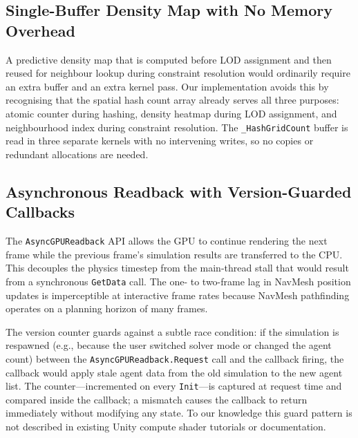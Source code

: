 \subsection{Single-Buffer Density Map with No Memory Overhead}

A predictive density map that is computed before LOD assignment and then reused
for neighbour lookup during constraint resolution would ordinarily require an
extra buffer and an extra kernel pass.  Our implementation avoids this by
recognising that the spatial hash count array already serves all three
purposes: atomic counter during hashing, density heatmap during LOD assignment,
and neighbourhood index during constraint resolution.  The
\texttt{\_HashGridCount} buffer is read in three separate kernels with no
intervening writes, so no copies or redundant allocations are needed.

\subsection{Asynchronous Readback with Version-Guarded Callbacks}

The \texttt{AsyncGPUReadback} API allows the GPU to continue rendering the
next frame while the previous frame's simulation results are transferred to the
CPU.  This decouples the physics timestep from the main-thread stall that would
result from a synchronous \texttt{GetData} call.  The one- to two-frame lag
in NavMesh position updates is imperceptible at interactive frame rates because
NavMesh pathfinding operates on a planning horizon of many frames.

The version counter guards against a subtle race condition: if the simulation
is respawned (e.g., because the user switched solver mode or changed the agent
count) between the \texttt{AsyncGPUReadback.Request} call and the callback
firing, the callback would apply stale agent data from the old simulation to
the new agent list.  The counter---incremented on every \texttt{Init}---is
captured at request time and compared inside the callback; a mismatch causes
the callback to return immediately without modifying any state.  To our
knowledge this guard pattern is not described in existing Unity compute shader
tutorials or documentation.